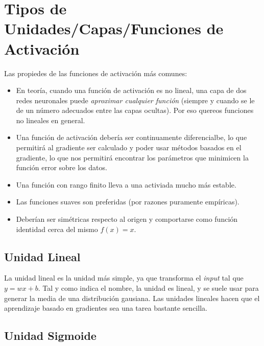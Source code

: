 \section{Tipos de Unidades/Capas/Funciones de Activación}

Las propiedes de las funciones de activación más comunes:

\begin{itemize}
    \item En teoría, cuando una función de activación es no lineal, una capa de dos redes neuronales puede \textit{aproximar cualquier función} (siempre y cuando se le de un número adecuados entre las capas ocultas). Por eso quereos funciones no lineales en general.
    \item Una función de activación debería ser continuamente diferencialbe, lo que permitirá al gradiente ser calculado y poder usar métodos basados en el gradiente, lo que nos permitirá encontrar los parámetros que minimicen la función error sobre los datos. 
    \item Una función con rango finito lleva a una activiada mucho más estable. 
    \item Las funciones suaves son preferidas (por razones puramente empíricas).
    \item Deberían ser simétricas respecto al origen y comportarse como función identidad cerca del mismo $f(x)=x$. 
\end{itemize}

\subsection{Unidad Lineal}

La unidad lineal es la unidad más simple, ya que transforma el \textit{input} tal que $y=w x + b$. Tal y como indica el nombre, la unidad es lineal, y se suele usar para generar la media de una distribución gausiana. Las unidades lineales hacen que el aprendizaje basado en gradientes sea una tarea bastante sencilla.

\subsection{Unidad Sigmoide}

